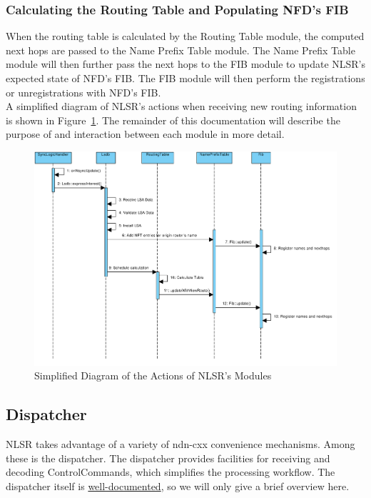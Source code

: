 \subsubsection{Calculating the Routing Table and Populating NFD's FIB}

When the routing table is calculated by the Routing Table module, the computed next hops are passed to the Name Prefix Table module.
The Name Prefix Table module will then further pass the next hops to the FIB module to update NLSR's expected state of NFD's FIB.
The FIB module will then perform the registrations or unregistrations with NFD's FIB.\\

A simplified diagram of NLSR's actions when receiving new routing information is shown in Figure~\ref{fig:system-interaction}.
The remainder of this documentation will describe the purpose of and interaction between each module in more detail.

\begin{figure}
\center
\includegraphics[width=\linewidth]{figures/system-interaction.pdf}
\caption{Simplified Diagram of the Actions of NLSR's Modules}
\label{fig:system-interaction}
\end{figure}

\subsection{Dispatcher}
\label{sec:dispatcher}

NLSR takes advantage of a variety of ndn-cxx convenience
mechanisms. Among these is the dispatcher. The dispatcher provides
facilities for receiving and decoding ControlCommands, which
simplifies the processing workflow. The dispatcher itself is
\href{http://named-data.net/doc/ndn-cxx/current/doxygen/de/d34/classndn_1_1mgmt_1_1Dispatcher.html}{well-documented},
so we will only give a brief overview here.

